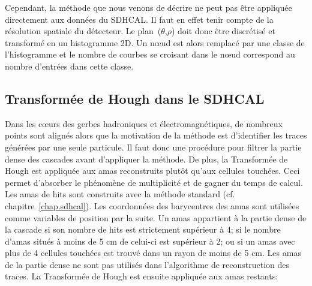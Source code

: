 Cependant, la méthode que nous venons de décrire ne peut pas être appliquée directement aux données du SDHCAL. Il faut en effet tenir compte de la résolution spatiale du détecteur. Le plan~($\theta$,$\rho$) doit donc être discrétisé et transformé en un histogramme 2D. Un nœud est alors remplacé par une classe de l’histogramme et le nombre de courbes se croisant dans le nœud correspond au nombre d'entrées dans cette classe.

\subsection{Transformée de Hough dans le SDHCAL}
Dans les cœurs des gerbes hadroniques et électromagnétiques, de nombreux points sont alignés alors que la motivation de la méthode est d'identifier les traces générées par une seule particule. Il faut donc une procédure pour filtrer la partie dense des cascades avant d'appliquer la méthode. De plus, la Transformée de Hough est appliquée aux amas reconstruits plutôt qu'aux cellules touchées. Ceci permet d'absorber le phénomène de multiplicité et de gagner du temps de calcul. Les amas de hits sont construits avec la méthode standard (cf. chapitre~\ref{chap.sdhcal}). Les coordonnées des barycentres des amas sont utilisées comme variables de position par la suite. Un amas appartient à la partie dense de la cascade si son nombre de hits est strictement supérieur à 4; si le nombre d'amas situés à moins de 5 cm de celui-ci est supérieur à 2; ou si un amas avec plus de 4 cellules touchées est trouvé dans un rayon de moins de 5 cm. Les amas de la partie dense ne sont pas utilisés dans l'algorithme de reconstruction des traces. La Transformée de Hough est ensuite appliquée aux amas restants:
